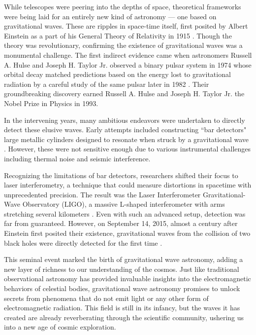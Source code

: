 While telescopes were peering into the depths of space, theoretical frameworks were being laid for an entirely new kind of astronomy — one based on gravitational waves. These are ripples in space-time itself, first posited by Albert Einstein as a part of his General Theory of Relativity in 1915 \cite{Einstein:1905vqn}. Though the theory was revolutionary, confirming the existence of gravitational waves was a monumental challenge. The first indirect evidence came when astronomers Russell A. Hulse and Joseph H. Taylor Jr. observed a binary pulsar system in 1974 \cite{Hulse:1974eb} whose orbital decay matched predictions based on the energy lost to gravitational radiation by a careful study of the same pulsar later in 1982 \cite{Weisberg:2010zz}. Their groundbreaking discovery earned Russell A. Hulse and Joseph H. Taylor Jr. the Nobel Prize in Physics in 1993.

In the intervening years, many ambitious endeavors were undertaken to directly detect these elusive waves. Early attempts included constructing ``bar detectors" large metallic cylinders designed to resonate when struck by a gravitational wave \cite{Weber:1960zz}. However, these were not sensitive enough due to various instrumental challenges including thermal noise and seismic interference.

Recognizing the limitations of bar detectors, researchers shifted their focus to laser interferometry, a technique that could measure distortions in spacetime with unprecedented precision. The result was the Laser Interferometer Gravitational-Wave Observatory (LIGO), a massive L-shaped interferometer with arms stretching several kilometers \cite{LIGOScientific:2007fwp}. Even with such an advanced setup, detection was far from guaranteed. However, on September 14, 2015, almost a century after Einstein first posited their existence, gravitational waves from the collision of two black holes were directly detected for the first time \cite{LIGOScientific:2016aoc}.

This seminal event marked the birth of gravitational wave astronomy, adding a new layer of richness to our understanding of the cosmos. Just like traditional observational astronomy has provided invaluable insights into the electromagnetic behaviors of celestial bodies, gravitational wave astronomy promises to unlock secrets from phenomena that do not emit light or any other form of electromagnetic radiation. This field is still in its infancy, but the waves it has created are already reverberating through the scientific community, ushering us into a new age of cosmic exploration.



